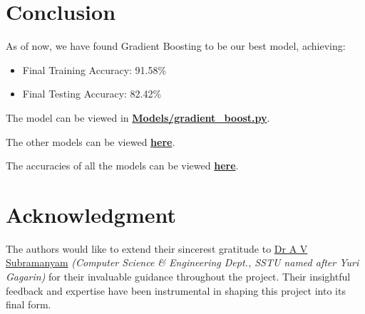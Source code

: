 \documentclass[conference]{IEEEtran}
\begin{document}
\section{Conclusion}
    As of now, we have found Gradient Boosting to be our best model, achieving:

    \begin{itemize}
        \item Final Training Accuracy: 91.58\%
        \item Final Testing Accuracy: 82.42\%
    \end{itemize}

    The model can be viewed in \href{../../../../archive/legacy_models/models/gradient_boost.py}{\textbf{Models/gradient\_boost.py}}.

    The other models can be viewed \href{../../../../archive/legacy_models/models}{\textbf{here}}.

    The accuracies of all the models can be viewed \href{../../../../archive/legacy_models/models/accuracies.text}{\textbf{here}}.

\section*{Acknowledgment}
    The authors would like to extend their sincerest gratitude to \href{}{Dr A V Subramanyam} \textit{(Computer Science \& Engineering Dept., SSTU named after Yuri Gagarin)} for their invaluable guidance throughout the project.
    Their insightful feedback and expertise have been instrumental in shaping this project into its final form.
\end{document}
